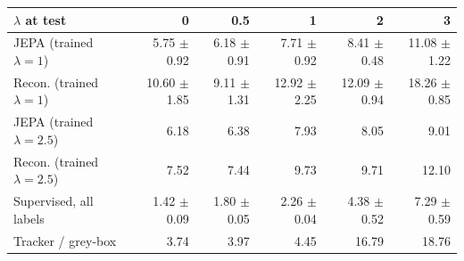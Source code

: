 \begin{tabular}{lrrrrr}
\toprule
$\lambda$ at test & 0 & 0.5 & 1 & 2 & 3\\
\midrule
JEPA (trained $\lambda=1$) & 5.75 $\pm$ 0.92 & 6.18 $\pm$ 0.91 & 7.71 $\pm$ 0.92 & 8.41 $\pm$ 0.48 & 11.08 $\pm$ 1.22\\
Recon. (trained $\lambda=1$) & 10.60 $\pm$ 1.85 & 9.11 $\pm$ 1.31 & 12.92 $\pm$ 2.25 & 12.09 $\pm$ 0.94 & 18.26 $\pm$ 0.85\\
JEPA (trained $\lambda=2.5$) & 6.18 & 6.38 & 7.93 & 8.05 & 9.01\\
Recon. (trained $\lambda=2.5$) & 7.52 & 7.44 & 9.73 & 9.71 & 12.10\\
Supervised, all labels & 1.42 $\pm$ 0.09 & 1.80 $\pm$ 0.05 & 2.26 $\pm$ 0.04 & 4.38 $\pm$ 0.52 & 7.29 $\pm$ 0.59\\
Tracker / grey-box & 3.74 & 3.97 & 4.45 & 16.79 & 18.76\\
\bottomrule
\end{tabular}
